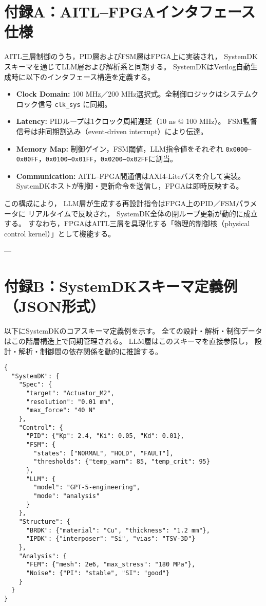 \appendix
\section*{付録A：AITL–FPGAインタフェース仕様}

AITL三層制御のうち，PID層およびFSM層はFPGA上に実装され，
SystemDKスキーマを通じてLLM層および解析系と同期する。
SystemDKはVerilog自動生成時に以下のインタフェース構造を定義する。

\begin{itemize}
  \item \textbf{Clock Domain:} 100 MHz／200 MHz選択式。全制御ロジックはシステムクロック信号 \texttt{clk\_sys} に同期。
  \item \textbf{Latency:} PIDループは1クロック周期遅延（10 ns @ 100 MHz）。
        FSM監督信号は非同期割込み（event-driven interrupt）により伝達。
  \item \textbf{Memory Map:} 制御ゲイン，FSM閾値，LLM指令値をそれぞれ
        \texttt{0x0000–0x00FF}，\texttt{0x0100–0x01FF}，\texttt{0x0200–0x02FF}に割当。
  \item \textbf{Communication:} AITL–FPGA間通信はAXI4-Liteバスを介して実装。
        SystemDKホストが制御・更新命令を送信し，FPGAは即時反映する。
\end{itemize}

この構成により，
LLM層が生成する再設計指令はFPGA上のPID／FSMパラメータに
リアルタイムで反映され，
SystemDK全体の閉ループ更新が動的に成立する。
すなわち，FPGAはAITL三層を具現化する「物理的制御核（physical control kernel）」として機能する。

---

\section*{付録B：SystemDKスキーマ定義例（JSON形式）}

以下にSystemDKのコアスキーマ定義例を示す。
全ての設計・解析・制御データはこの階層構造上で同期管理される。
LLM層はこのスキーマを直接参照し，
設計・解析・制御間の依存関係を動的に推論する。

\begin{verbatim}
{
  "SystemDK": {
    "Spec": {
      "target": "Actuator_M2",
      "resolution": "0.01 mm",
      "max_force": "40 N"
    },
    "Control": {
      "PID": {"Kp": 2.4, "Ki": 0.05, "Kd": 0.01},
      "FSM": {
        "states": ["NORMAL", "HOLD", "FAULT"],
        "thresholds": {"temp_warn": 85, "temp_crit": 95}
      },
      "LLM": {
        "model": "GPT-5-engineering",
        "mode": "analysis"
      }
    },
    "Structure": {
      "BRDK": {"material": "Cu", "thickness": "1.2 mm"},
      "IPDK": {"interposer": "Si", "vias": "TSV-3D"}
    },
    "Analysis": {
      "FEM": {"mesh": 2e6, "max_stress": "180 MPa"},
      "Noise": {"PI": "stable", "SI": "good"}
    }
  }
}
\end{verbatim}

